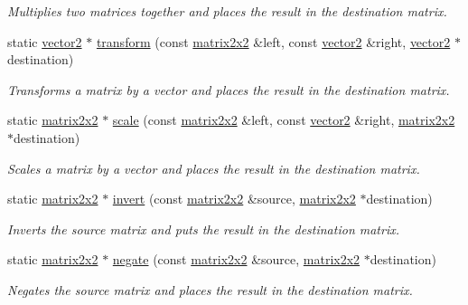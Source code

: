 \begin{DoxyCompactItemize}
\begin{DoxyCompactList}\small\item\em Multiplies two matrices together and places the result in the destination matrix. \end{DoxyCompactList}\item 
static \hyperlink{classflounder_1_1vector2}{vector2} $\ast$ \hyperlink{classflounder_1_1matrix2x2_a7d1782258fb216205a1415eaccb08a44}{transform} (const \hyperlink{classflounder_1_1matrix2x2}{matrix2x2} \&left, const \hyperlink{classflounder_1_1vector2}{vector2} \&right, \hyperlink{classflounder_1_1vector2}{vector2} $\ast$destination)
\begin{DoxyCompactList}\small\item\em Transforms a matrix by a vector and places the result in the destination matrix. \end{DoxyCompactList}\item 
static \hyperlink{classflounder_1_1matrix2x2}{matrix2x2} $\ast$ \hyperlink{classflounder_1_1matrix2x2_a0d796333ce46e109d880dfcf3dd5cc35}{scale} (const \hyperlink{classflounder_1_1matrix2x2}{matrix2x2} \&left, const \hyperlink{classflounder_1_1vector2}{vector2} \&right, \hyperlink{classflounder_1_1matrix2x2}{matrix2x2} $\ast$destination)
\begin{DoxyCompactList}\small\item\em Scales a matrix by a vector and places the result in the destination matrix. \end{DoxyCompactList}\item 
static \hyperlink{classflounder_1_1matrix2x2}{matrix2x2} $\ast$ \hyperlink{classflounder_1_1matrix2x2_ae436586adaec6b5b47a2480e1162c25e}{invert} (const \hyperlink{classflounder_1_1matrix2x2}{matrix2x2} \&source, \hyperlink{classflounder_1_1matrix2x2}{matrix2x2} $\ast$destination)
\begin{DoxyCompactList}\small\item\em Inverts the source matrix and puts the result in the destination matrix. \end{DoxyCompactList}\item 
static \hyperlink{classflounder_1_1matrix2x2}{matrix2x2} $\ast$ \hyperlink{classflounder_1_1matrix2x2_a16af599f663fd268f783dfbda5ef8431}{negate} (const \hyperlink{classflounder_1_1matrix2x2}{matrix2x2} \&source, \hyperlink{classflounder_1_1matrix2x2}{matrix2x2} $\ast$destination)
\begin{DoxyCompactList}\small\item\em Negates the source matrix and places the result in the destination matrix. \end{DoxyCompactList}\item 

\end{DoxyCompactItemize}
